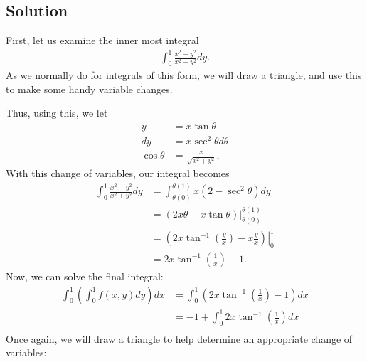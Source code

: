 \documentclass[10pt,a4paper]{article}
\theoremstyle{theorem}
\theoremstyle{definition}
\begin{document}
\subsection*{Solution}
First, let us examine the inner most integral
\begin{align*}
\int_0^1 \frac{x^2 - y^2}{x^2 + y^2}dy.
\end{align*}
As we normally do for integrals of this form, we will draw a triangle, and use this to make some handy variable changes.
\begin{center}
\end{center}
Thus, using this, we let 
\begin{align*}
y &= x\tan\theta\\
dy &= x \sec^2 \theta d \theta\\
\cos \theta &= \frac{x}{\sqrt{x^2 + y^2}},
\end{align*}
With this change of variables, our integral becomes
\begin{align*}
\int_0^1 \frac{x^2 - y^2}{x^2 + y^2}dy &= \int_{\theta(0)}^{\theta(1)} x(2 - \sec^2 \theta)dy\\
&= \left. (2x \theta - x\tan \theta ) \right|_{\theta(0)}^{\theta(1)}\\
&= \left. \left(2x \tan^{-1}\left(\frac{y}{x}\right) - x\frac{y}{x} \right) \right|_0^1\\
&= 2x \tan^{-1}\left(\frac{1}{x}\right) - 1.
\end{align*}
Now, we can solve the final integral:
\begin{align*}
\int_0^1 \left(\int_0^1 f(x, y)dy \right) dx &= \int_0^1 \left(2x \tan^{-1}\left(\frac{1}{x}\right) - 1 \right) dx\\
&= -1 + \int_0^1 2x \tan^{-1}\left(\frac{1}{x}\right) dx\\
\end{align*}
Once again, we will draw a triangle to help determine an appropriate change of variables:
\begin{center}
\end{center}
\end{document}
